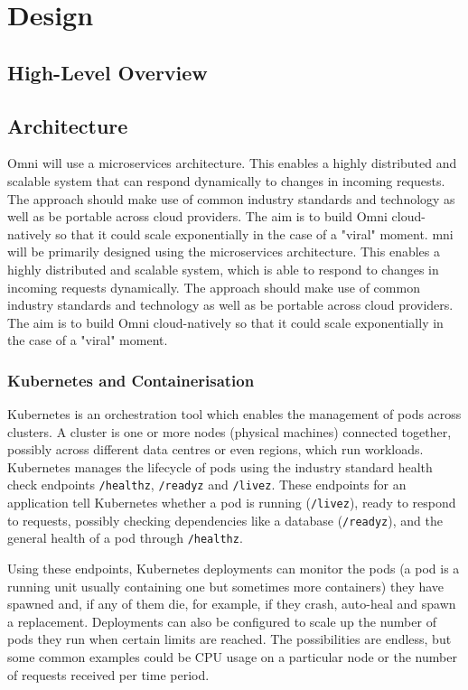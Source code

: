 \chapter{Design}
\label{cha:design}

\section{High-Level Overview}
\label{sec:design-overview}

\section{Architecture}
\label{sec:design-architecture}
Omni will use a microservices architecture. This enables a highly distributed and scalable system that can respond dynamically to changes in incoming requests.
The approach should make use of common industry standards and technology as well as be portable across cloud providers. The aim is to build Omni cloud-natively so that it could scale exponentially in the case of a "viral" moment.
mni will be primarily designed using the microservices architecture. This enables a highly distributed and scalable system, which is able to respond to changes in incoming requests dynamically. 
The approach should make use of common industry standards and technology as well as be portable across cloud providers. The aim is to build Omni cloud-natively so that it could scale exponentially in the case of a "viral" moment.

\subsection{Kubernetes and Containerisation}
\label{sec:design-system-kubernetes}
Kubernetes is an orchestration tool which enables the management of pods across clusters. A cluster is one or more nodes (physical machines) connected together, possibly across different data centres or even regions, which run workloads.
Kubernetes manages the lifecycle of pods using the industry standard health check endpoints \texttt{/healthz}, \texttt{/readyz} and \texttt{/livez}. These endpoints for an application tell Kubernetes whether a pod is running (\texttt{/livez}), ready to respond to requests, possibly checking dependencies like a database (\texttt{/readyz}), and the general health of a pod through \texttt{/healthz}.

Using these endpoints, Kubernetes deployments can monitor the pods (a pod is a running unit usually containing one but sometimes more containers) they have spawned and, if any of them die, for example, if they crash, auto-heal and spawn a replacement.
Deployments can also be configured to scale up the number of pods they run when certain limits are reached. The possibilities are endless, but some common examples could be CPU usage on a particular node or the number of requests received per time period.

